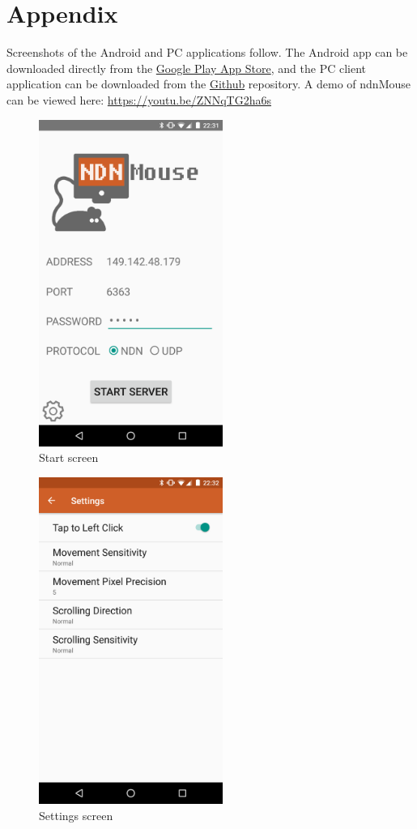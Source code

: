 \documentclass{sig-alternate}
\renewcommand\_{\textunderscore\allowbreak}  %
\begin{document}
\section{Appendix}
\label{sec:appendix}
Screenshots of the Android and PC applications follow. The Android app can be downloaded directly from the \href{https://play.google.com/store/apps/details?id=edu.ucla.cs.ndnmouse}{Google Play App Store}, and the PC client application can be downloaded from the \href{https://github.com/wminner/ndnMouse/tree/master/pc_client}{Github} repository. A demo of ndnMouse can be viewed here: \href{https://youtu.be/ZNNqTG2ha6s}{https://youtu.be/ZNNqTG2ha6s}

\begin{figure}[hp]
	\hypertarget{fig:start}{}
	\centering
	\includegraphics[width=6cm]{screenshots/start}
	\caption{Start screen}
\end{figure}

\begin{figure}[hp]
	\hypertarget{fig:settings}{}
	\centering
	\includegraphics[width=6cm]{screenshots/settings}
	\caption{Settings screen}
\end{figure}
\end{document}
